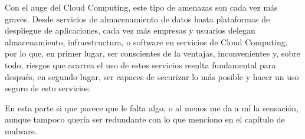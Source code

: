 Con el auge del Cloud Computing, este tipo de amenazas son cada vez más graves. Desde servicios de almacenamiento de datos hasta plataformas de despliegue de aplicaciones, cada vez más empresas y usuarios delegan almacenamiento, infraestructura, o software en servicios de Cloud Computing, por lo que, en primer lugar, ser conscientes de la ventajas, inconvenientes y, sobre todo, riesgos que acarrea el uso de estos servicios resulta fundamental para después, en segundo lugar, ser capaces de securizar lo más posible y hacer un uso seguro de esto servicios.

{\color{red} En esta parte si que parece que le falta algo, o al menos me da a mí la sensación, aunque tampoco quería ser redundante con lo que menciono en el capítulo de malware.}
